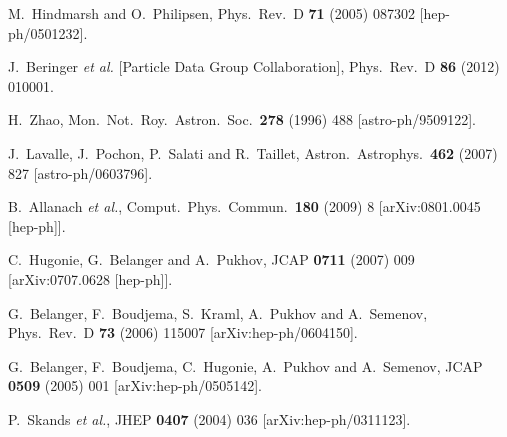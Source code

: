 \documentclass[12pt,a4paper]{article}
\begin{document}
\begin{thebibliography}{}
  M.~Hindmarsh and O.~Philipsen,
  Phys.\ Rev.\ D {\bf 71} (2005) 087302
  [hep-ph/0501232].


  J.~Beringer {\it et al.}  [Particle Data Group Collaboration],
  Phys.\ Rev.\ D {\bf 86} (2012) 010001.

  H.~Zhao,
  Mon.\ Not.\ Roy.\ Astron.\ Soc.\  {\bf 278} (1996) 488
  [astro-ph/9509122].

  J.~Lavalle, J.~Pochon, P.~Salati and R.~Taillet,
  Astron.\ Astrophys.\  {\bf 462} (2007) 827
  [astro-ph/0603796].

  B.~Allanach {\it et al.},
  Comput.\ Phys.\ Commun.\  {\bf 180} (2009) 8
  [arXiv:0801.0045 [hep-ph]].

  C.~Hugonie, G.~Belanger and A.~Pukhov,
  JCAP {\bf 0711} (2007) 009
  [arXiv:0707.0628 [hep-ph]].






  G.~Belanger, F.~Boudjema, S.~Kraml, A.~Pukhov and A.~Semenov,
  Phys.\ Rev.\  D {\bf 73} (2006) 115007
  [arXiv:hep-ph/0604150].



  G.~Belanger, F.~Boudjema, C.~Hugonie, A.~Pukhov and A.~Semenov,
  JCAP {\bf 0509} (2005) 001
  [arXiv:hep-ph/0505142].




  P.~Skands {\it et al.},
  JHEP {\bf 0407} (2004) 036
  [arXiv:hep-ph/0311123].





\end{thebibliography}
\end{document}

